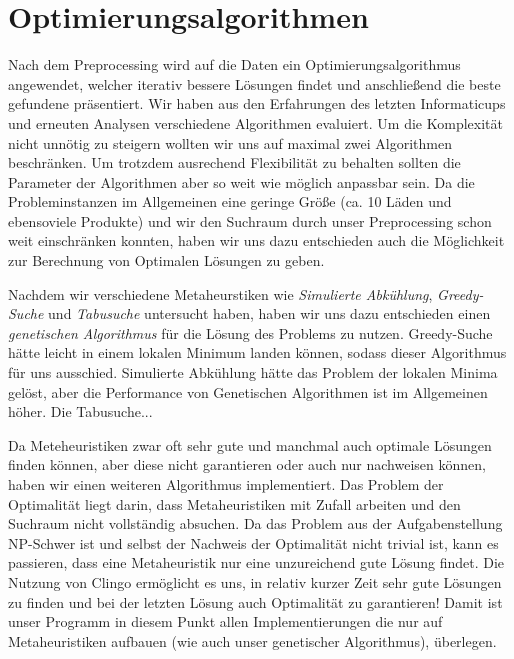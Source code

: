 \section{Optimierungsalgorithmen}

Nach dem Preprocessing wird auf die Daten ein Optimierungsalgorithmus angewendet, welcher iterativ bessere Lösungen findet und anschließend die beste gefundene präsentiert. Wir haben aus den Erfahrungen des letzten Informaticups und erneuten Analysen verschiedene Algorithmen evaluiert. Um die Komplexität nicht unnötig zu steigern wollten wir uns auf maximal zwei Algorithmen beschränken. Um trotzdem ausrechend Flexibilität zu behalten sollten die Parameter der Algorithmen aber so weit wie möglich anpassbar sein. Da die Probleminstanzen im Allgemeinen eine geringe Größe (ca. 10 Läden und ebensoviele Produkte) und wir den Suchraum durch unser Preprocessing schon weit einschränken konnten, haben wir uns dazu entschieden auch die Möglichkeit zur Berechnung von Optimalen Lösungen zu geben. 

Nachdem wir verschiedene Metaheurstiken wie \emph{Simulierte Abkühlung}, \emph{Greedy-Suche} und \emph{Tabusuche} untersucht haben, haben wir uns dazu entschieden einen \emph{genetischen Algorithmus} für die Lösung des Problems zu nutzen. Greedy-Suche hätte leicht in einem lokalen Minimum landen können, sodass dieser Algorithmus für uns ausschied. Simulierte Abkühlung hätte das Problem der lokalen Minima gelöst, aber die Performance von Genetischen Algorithmen ist im Allgemeinen höher. Die Tabusuche...

Da Meteheuristiken zwar oft sehr gute und manchmal auch optimale Lösungen finden können, aber diese nicht garantieren oder auch nur nachweisen können, haben wir einen weiteren Algorithmus implementiert. Das Problem der Optimalität liegt darin, dass Metaheuristiken mit Zufall arbeiten und den Suchraum nicht vollständig absuchen. Da das Problem aus der Aufgabenstellung NP-Schwer ist und selbst der Nachweis der Optimalität nicht trivial ist, kann es passieren, dass eine Metaheuristik nur eine unzureichend gute Lösung findet. Die Nutzung von Clingo ermöglicht es uns, in relativ kurzer Zeit sehr gute Lösungen zu finden und bei der letzten Lösung auch Optimalität zu garantieren! Damit ist unser Programm in diesem Punkt allen Implementierungen die nur auf Metaheuristiken aufbauen (wie auch unser genetischer Algorithmus), überlegen.



